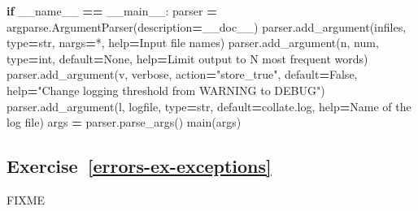\documentclass[
]{krantz}
\makeatletter
\newenvironment{Shaded}{\begin{snugshade}}{\end{snugshade}}
\newcommand{\BuiltInTok}[1]{#1}
\newcommand{\ControlFlowTok}[1]{\textcolor[rgb]{0.13,0.29,0.53}{\textbf{#1}}}
\newcommand{\NormalTok}[1]{#1}
\newcommand{\OperatorTok}[1]{\textcolor[rgb]{0.81,0.36,0.00}{\textbf{#1}}}
\newcommand{\StringTok}[1]{\textcolor[rgb]{0.31,0.60,0.02}{#1}}
\newcommand{\VariableTok}[1]{\textcolor[rgb]{0.00,0.00,0.00}{#1}}
\newenvironment{kframe}{%
\medskip{}
\setlength{\fboxsep}{.8em}
 \def\at@end@of@kframe{}%
 \ifinner\ifhmode%
  \def\at@end@of@kframe{\end{minipage}}%
  \begin{minipage}{\columnwidth}%
 \fi\fi%
 \def\FrameCommand##1{\hskip\@totalleftmargin \hskip-\fboxsep
 \colorbox{shadecolor}{##1}\hskip-\fboxsep
     \hskip-\linewidth \hskip-\@totalleftmargin \hskip\columnwidth}%
 \MakeFramed {\advance\hsize-\width
   \@totalleftmargin\z@ \linewidth\hsize
   \@setminipage}}%
 {\par\unskip\endMakeFramed%
 \at@end@of@kframe}
\renewenvironment{Shaded}{\begin{kframe}}{\end{kframe}}
\makeatother
\begin{document}
\begin{Shaded}
\begin{Highlighting}[]
\ControlFlowTok{if} \VariableTok{\_\_name\_\_} \OperatorTok{==} \StringTok{\textquotesingle{}\_\_main\_\_\textquotesingle{}}\NormalTok{:}
\NormalTok{    parser }\OperatorTok{=}\NormalTok{ argparse.ArgumentParser(description}\OperatorTok{=}\NormalTok{\_\_doc\_\_)}
\NormalTok{    parser.add\_argument(}\StringTok{\textquotesingle{}infiles\textquotesingle{}}\NormalTok{, }\BuiltInTok{type}\OperatorTok{=}\BuiltInTok{str}\NormalTok{, nargs}\OperatorTok{=}\StringTok{\textquotesingle{}*\textquotesingle{}}\NormalTok{, }\BuiltInTok{help}\OperatorTok{=}\StringTok{\textquotesingle{}Input file names\textquotesingle{}}\NormalTok{)}
\NormalTok{    parser.add\_argument(}\StringTok{\textquotesingle{}{-}n\textquotesingle{}}\NormalTok{, }\StringTok{\textquotesingle{}{-}{-}num\textquotesingle{}}\NormalTok{, }\BuiltInTok{type}\OperatorTok{=}\BuiltInTok{int}\NormalTok{, default}\OperatorTok{=}\VariableTok{None}\NormalTok{,}
                        \BuiltInTok{help}\OperatorTok{=}\StringTok{\textquotesingle{}Limit output to N most frequent words\textquotesingle{}}\NormalTok{)}
\NormalTok{    parser.add\_argument(}\StringTok{\textquotesingle{}{-}v\textquotesingle{}}\NormalTok{, }\StringTok{\textquotesingle{}{-}{-}verbose\textquotesingle{}}\NormalTok{, action}\OperatorTok{=}\StringTok{"store\_true"}\NormalTok{, default}\OperatorTok{=}\VariableTok{False}\NormalTok{,}
                        \BuiltInTok{help}\OperatorTok{=}\StringTok{"Change logging threshold from WARNING to DEBUG"}\NormalTok{)}
\NormalTok{    parser.add\_argument(}\StringTok{\textquotesingle{}{-}l\textquotesingle{}}\NormalTok{, }\StringTok{\textquotesingle{}{-}{-}logfile\textquotesingle{}}\NormalTok{, }\BuiltInTok{type}\OperatorTok{=}\BuiltInTok{str}\NormalTok{, default}\OperatorTok{=}\StringTok{\textquotesingle{}collate.log\textquotesingle{}}\NormalTok{,}
                        \BuiltInTok{help}\OperatorTok{=}\StringTok{\textquotesingle{}Name of the log file\textquotesingle{}}\NormalTok{)}
\NormalTok{    args }\OperatorTok{=}\NormalTok{ parser.parse\_args()}
\NormalTok{    main(args)}
\end{Highlighting}
\end{Shaded}

\hypertarget{exercise-referrors-ex-exceptions}{%
\subsection*{Exercise~\ref{errors-ex-exceptions}}\label{exercise-referrors-ex-exceptions}}


FIXME
\end{document}
